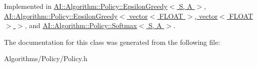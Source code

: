 Implemented in \hyperlink{classAI_1_1Algorithm_1_1Policy_1_1EpsilonGreedy_a00a2dde7f4df14fd046e034694184f65}{A\-I\-::\-Algorithm\-::\-Policy\-::\-Epsilon\-Greedy$<$ S, A $>$}, \hyperlink{classAI_1_1Algorithm_1_1Policy_1_1EpsilonGreedy_a00a2dde7f4df14fd046e034694184f65}{A\-I\-::\-Algorithm\-::\-Policy\-::\-Epsilon\-Greedy$<$ vector$<$ F\-L\-O\-A\-T $>$, vector$<$ F\-L\-O\-A\-T $>$ $>$}, and \hyperlink{classAI_1_1Algorithm_1_1Policy_1_1Softmax_adf507bcadedab2d33e3fcc0059918d19}{A\-I\-::\-Algorithm\-::\-Policy\-::\-Softmax$<$ S, A $>$}.



The documentation for this class was generated from the following file\-:\begin{DoxyCompactItemize}
\item 
Algorithms/\-Policy/Policy.\-h\end{DoxyCompactItemize}
